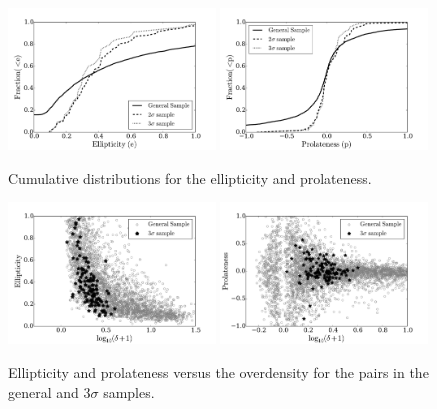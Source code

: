 \documentclass{emulateapj}
\begin{document}
\begin{figure}
\begin{center}
  \includegraphics[width=0.49\textwidth]{ELL_histogram.pdf}
  \includegraphics[width=0.49\textwidth]{PROL_histogram.pdf}
\end{center}
\caption{Cumulative distributions for the ellipticity and prolateness.
    \label{fig:ELL_PROL}}  
\end{figure}


\begin{figure}
\begin{center}
  \includegraphics[width=0.49\textwidth]{ELL_delta_scatter.pdf}
  \includegraphics[width=0.49\textwidth]{PROL_delta_scatter.pdf}
\end{center}
\caption{Ellipticity and prolateness versus the overdensity for the pairs
in the general and $3\sigma$ samples. \label{fig:delta_ELL_PROL}} 
\end{figure}
\end{document}
